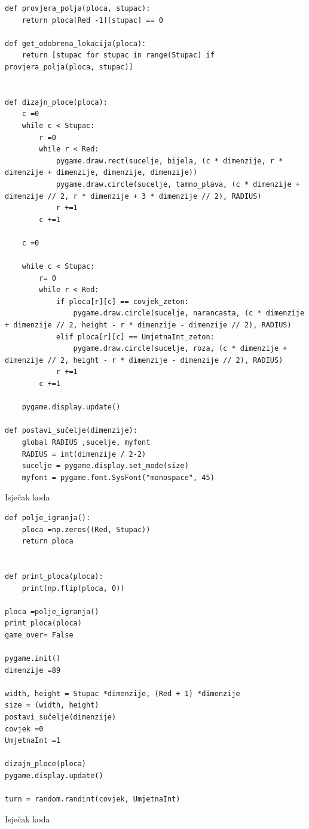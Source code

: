 \documentclass[]{foi}
\begin{document}
\begin{listing}
    \begin{verbatim}
def provjera_polja(ploca, stupac):
    return ploca[Red -1][stupac] == 0

def get_odobrena_lokacija(ploca):
    return [stupac for stupac in range(Stupac) if provjera_polja(ploca, stupac)]


def dizajn_ploce(ploca):
    c =0
    while c < Stupac:
        r =0
        while r < Red:
            pygame.draw.rect(sucelje, bijela, (c * dimenzije, r * dimenzije + dimenzije, dimenzije, dimenzije))
            pygame.draw.circle(sucelje, tamno_plava, (c * dimenzije + dimenzije // 2, r * dimenzije + 3 * dimenzije // 2), RADIUS)
            r +=1
        c +=1

    c =0
    
    while c < Stupac:
        r= 0
        while r < Red:
            if ploca[r][c] == covjek_zeton:
                pygame.draw.circle(sucelje, narancasta, (c * dimenzije + dimenzije // 2, height - r * dimenzije - dimenzije // 2), RADIUS)
            elif ploca[r][c] == UmjetnaInt_zeton:
                pygame.draw.circle(sucelje, roza, (c * dimenzije + dimenzije // 2, height - r * dimenzije - dimenzije // 2), RADIUS)
            r +=1
        c +=1

    pygame.display.update()

def postavi_sučelje(dimenzije):
    global RADIUS ,sucelje, myfont
    RADIUS = int(dimenzije / 2-2)
    sucelje = pygame.display.set_mode(size)
    myfont = pygame.font.SysFont("monospace", 45)
    \end{verbatim}
    \caption{Isječak koda}
    \label{lst:dva}
\end{listing}

\begin{listing}
    \begin{verbatim}
def polje_igranja():
    ploca =np.zeros((Red, Stupac))
    return ploca


def print_ploca(ploca):
    print(np.flip(ploca, 0))

ploca =polje_igranja()
print_ploca(ploca)
game_over= False

pygame.init()
dimenzije =89

width, height = Stupac *dimenzije, (Red + 1) *dimenzije
size = (width, height)
postavi_sučelje(dimenzije)
covjek =0
UmjetnaInt =1

dizajn_ploce(ploca)
pygame.display.update()

turn = random.randint(covjek, UmjetnaInt)
    \end{verbatim}
    \caption{Isječak koda}
    \label{lst:dva}
\end{listing}
\end{document}
